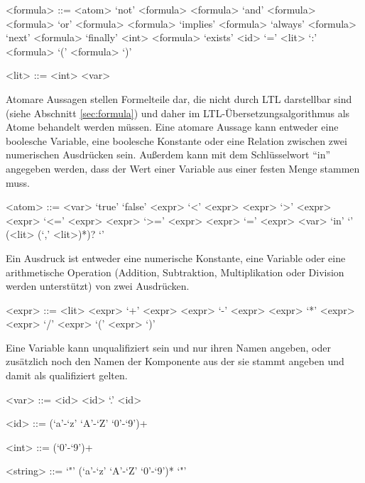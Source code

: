 \begin{grammar}
  <formula> ::= <atom>
  \alt `not' <formula>
  \alt <formula> `and' <formula>
  \alt <formula> `or' <formula>
  \alt <formula> `implies' <formula>
  \alt `always' <formula>
  \alt `next' <formula>
  \alt `finally' <int> <formula>
  \alt `exists' <id> `=' <lit> `:' <formula>
  \alt `(' <formula> `)'
  
  <lit> ::= <int>
  \alt <var>
\end{grammar}
Atomare Aussagen stellen Formelteile dar, die nicht durch LTL darstellbar sind (siehe Abschnitt \ref{sec:formula}) und daher im LTL-Übersetzungsalgorithmus als Atome behandelt werden müssen.
Eine atomare Aussage kann entweder eine boolesche Variable, eine boolesche Konstante oder eine Relation zwischen zwei numerischen Ausdrücken sein.
Außerdem kann mit dem Schlüsselwort "`in"' angegeben werden, dass der Wert einer Variable aus einer festen Menge stammen muss.
\begin{grammar}
  <atom> ::= <var>
  \alt `true'
  \alt `false'
  \alt <expr> `<' <expr>
  \alt <expr> `>' <expr>
  \alt <expr> `<=' <expr>
  \alt <expr> `>=' <expr>
  \alt <expr> `=' <expr>
  \alt <var> `in' `{' (<lit> (`,' <lit>)*)? `}'
\end{grammar}
Ein Ausdruck ist entweder eine numerische Konstante, eine Variable oder eine arithmetische Operation (Addition, Subtraktion, Multiplikation oder Division werden unterstützt) von zwei Ausdrücken.
\begin{grammar}
  <expr> ::= <lit>
  \alt <expr> `+' <expr>
  \alt <expr> `-' <expr>
  \alt <expr> `*' <expr>
  \alt <expr> `/' <expr>
  \alt `(' <expr> `)'
\end{grammar}
Eine Variable kann unqualifiziert sein und nur ihren Namen angeben, oder zusätzlich noch den Namen der Komponente aus der sie stammt angeben und damit als qualifiziert gelten.
\begin{grammar}  
  <var> ::= <id>
  \alt <id> `.' <id>
  
  <id> ::= (`a'-`z' `A'-`Z' `0'-`9')+
  
  <int> ::= (`0'-`9')+

  <string> ::= `"' (`a'-`z' `A'-`Z' `0'-`9')* `"'
\end{grammar}
